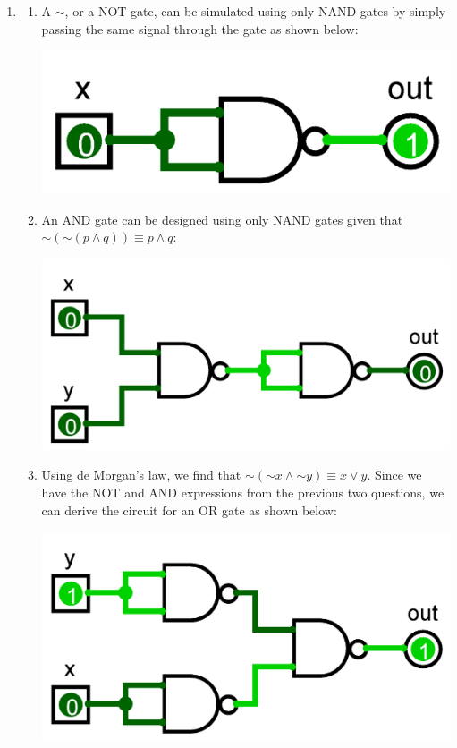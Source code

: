 \documentclass[11pt, notitlepage]{article}
\newcommand*{\oldneg}{\mathord{\sim}}
\begin{document}

\begin{enumerate}

\item \begin{enumerate}

\item A $\sim$, or a NOT gate, can be simulated using only NAND gates by simply passing the same signal through the gate as shown below:
\begin{center}
\includegraphics[scale=0.1]{1a}
\end{center}

\item An AND gate can be designed using only NAND gates given that $\oldneg (\oldneg (p \wedge q)) \equiv p \wedge q$:
\begin{center}
\includegraphics[scale=0.1]{1b}
\end{center}

\item Using de Morgan's law, we find that $\oldneg (\oldneg x \wedge \oldneg y) \equiv x \vee y$. Since we have the NOT and AND expressions from the previous two questions, we can derive the circuit for an OR gate as shown below:
\begin{center}
\includegraphics[scale=0.1]{1c}
\end{center}


\end{enumerate}
\end{enumerate}
\end{document}

